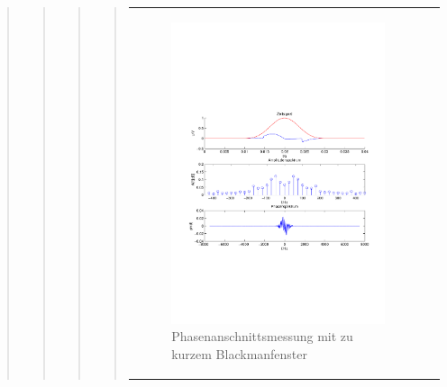 \begin{quote}
\begin{quote}
\begin{quote}
\begin{quote}
\begin{center}
\begin{tabular}{ll}
\begin{minipage}{0.6\textwidth}
                         \begin{figure}[H]
                            \label{fig:}
                            \includegraphics[scale=0.4, trim = 1.5cm 7cm 1.5cm 8cm,
                            clip]{./Bilder/Phasenanschnittsmessungmitblackmanfensterleckeffekt} %
                            \caption{Phasenanschnittsmessung mit zu kurzem Blackmanfenster}
                        \end{figure}
                   \vspace{-1.5em}
    
                    \end{minipage}
    
                \end{tabular}
                \end{center}
                

\end{quote}
\end{quote}
\end{quote}
\end{quote}
